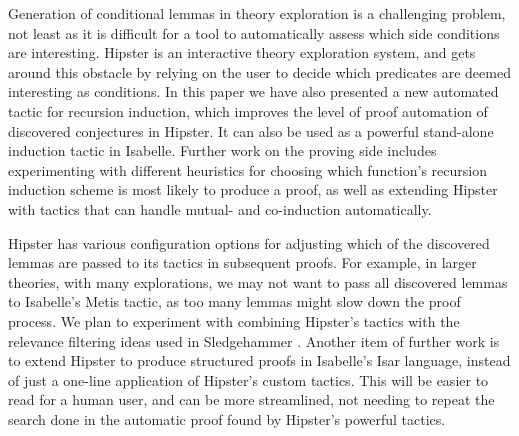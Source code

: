 \label{sec:conclusion}

Generation of conditional lemmas in theory exploration is a challenging problem, not least as it is difficult for a tool to automatically assess which side conditions are interesting.
%
Hipster is an interactive theory exploration system, and gets around this obstacle by relying on the user to decide which predicates are deemed interesting as conditions.
%
In this paper we have also presented a new automated tactic for recursion induction, which improves the level of proof automation of discovered conjectures in Hipster.
%
It can also be used as a powerful stand-alone induction tactic in Isabelle. 
%
Further work on the proving side includes experimenting with different heuristics for choosing which function's recursion induction scheme is most likely to produce a proof, as well as extending Hipster with tactics that can handle mutual- and co-induction automatically.

Hipster has various configuration options for adjusting which of the discovered lemmas are passed to its tactics in subsequent proofs.
%
For example, in larger theories, with many explorations, we may not want to pass all discovered lemmas to Isabelle's Metis tactic, as too many lemmas might slow down the proof process.
%
We plan to experiment with combining Hipster's tactics with the relevance filtering ideas used in Sledgehammer \cite{mash}.
%
Another item of further work is to extend Hipster to produce structured proofs in Isabelle's Isar language, instead of just a one-line application of Hipster's custom tactics.
%
This will be easier to read for a human user, and can be more streamlined, not needing to repeat the search done in the automatic proof found by Hipster's powerful tactics. 

